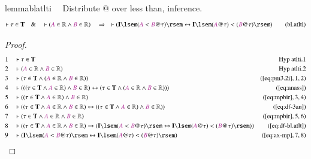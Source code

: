 \begin{restatable}{lemma}{blatlti}~~ Distribute @ over less than, inference.
\begin{align}
\vdash \tau \in \mathbf{T}\quad\&\quad \vdash ( \mc{A} \in \mathbb{R} \wedge
    \mc{B} \in \mathbb{R} )\quad\Rightarrow\quad \vdash ( \mathbf{I} \lsem (
    \mc{A} < \mc{B} @ \tau ) \rsem \leftrightarrow \mathbf{I} \lsem ( \mc{A} @
    \tau ) < ( \mc{B} @ \tau ) \rsem )\label{eq:bl.atlti}\tag{bl.atlti}
\end{align}
\end{restatable}

\begin{proof}
\begin{align}
  1 &&  & \vdash \tau \in \mathbf{T}&\text{Hyp~atlti.1}\notag%
  \\ 2 &&  & \vdash ( \mc{A} \in \mathbb{R} \wedge \mc{B} \in \mathbb{R}
      )&\text{Hyp~atlti.2}\notag%
  \\ 3 &&  & \vdash ( \tau \in \mathbf{T} \wedge ( \mc{A} \in \mathbb{R} \wedge
      \mc{B} \in \mathbb{R} )
      )&(\mbox{\ref{eq:pm3.2i}},1,2)\notag
  \\ 4 &&  & \vdash ( ( ( \tau \in \mathbf{T} \wedge \mc{A} \in \mathbb{R} )
      \wedge \mc{B} \in \mathbb{R} ) \leftrightarrow ( \tau
      \in \mathbf{T} \wedge ( \mc{A} \in \mathbb{R} \wedge
      \mc{B} \in \mathbb{R} ) )
      )&(\mbox{\ref{eq:anass}})\notag
  \\ 5 &&  & \vdash ( ( \tau \in \mathbf{T} \wedge \mc{A} \in \mathbb{R} )
      \wedge \mc{B} \in \mathbb{R}
      )&(\mbox{\ref{eq:mpbir}},3,4)\notag
  \\ 6 &&  & \vdash ( ( \tau \in \mathbf{T} \wedge \mc{A} \in \mathbb{R} \wedge
      \mc{B} \in \mathbb{R} ) \leftrightarrow ( ( \tau \in
      \mathbf{T} \wedge \mc{A} \in \mathbb{R} ) \wedge
      \mc{B} \in \mathbb{R} )
      )&(\mbox{\ref{eq:df-3an}})\notag
  \\ 7 &&  & \vdash ( \tau \in \mathbf{T} \wedge \mc{A} \in \mathbb{R} \wedge
      \mc{B} \in \mathbb{R}
      )&(\mbox{\ref{eq:mpbir}},5,6)\notag
  \\ 8 &&  & \vdash ( ( \tau \in \mathbf{T} \wedge \mc{A} \in \mathbb{R} \wedge
      \mc{B} \in \mathbb{R} ) \rightarrow ( \mathbf{I}
      \lsem ( \mc{A} < \mc{B} @ \tau ) \rsem
      \leftrightarrow \mathbf{I} \lsem ( \mc{A} @ \tau ) <
      ( \mc{B} @ \tau ) \rsem )
      )&(\mbox{\ref{eq:df-bl.atlt}})\notag
  \\ 9 &&  & \vdash ( \mathbf{I} \lsem ( \mc{A} < \mc{B} @ \tau ) \rsem
      \leftrightarrow \mathbf{I} \lsem ( \mc{A} @ \tau ) <
      ( \mc{B} @ \tau ) \rsem
      )&(\mbox{\ref{eq:ax-mp}},7,8)\notag
\end{align}
\end{proof}

